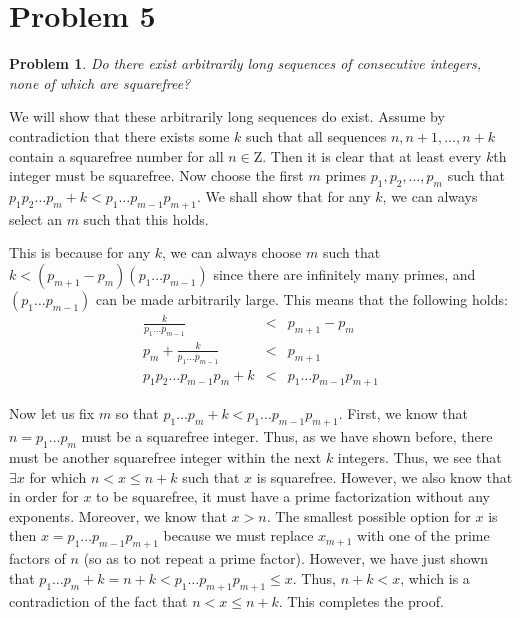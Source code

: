 \documentclass[psamsfonts]{amsart}
\newtheorem{prob}{Problem}[section]
\newenvironment{sol}{{\bfseries Solution}}{\qedsymbol}
\theoremstyle{definition}
\theoremstyle{remark}
\numberwithin{equation}{section}
\begin{document}
\section{Problem 5}

\begin{prob}
Do there exist arbitrarily long sequences of consecutive integers, none of which are squarefree? 
\end{prob}

\begin{sol}
We will show that these arbitrarily long sequences do exist. Assume by contradiction that there exists some $k$ such that all sequences $n, n+1, \ldots, n+k$ contain a squarefree number for all $n \in \mathrm{Z}$. Then it is clear that at least every $k$th integer must be squarefree. Now choose the first $m$ primes $p_1, p_2, \ldots, p_m$ such that $p_1 p_2 \ldots p_m + k < p_1 \ldots p_{m-1} p_{m+1}$. We shall show that for any $k$, we can always select an $m$ such that this holds. 

This is because for any $k$, we can always choose $m$ such that $k < (p_{m+1} - p_{m})(p_1 \ldots p_{m-1})$ since there are infinitely many primes, and $(p_1 \ldots p_{m-1})$ can be made arbitrarily large. This means that the following holds:
\begin{eqnarray}
\frac{k}{p_1 \ldots p_{m-1}} &<& p_{m+1} - p_m \\
p_m + \frac{k}{p_1 \ldots p_{m-1}} &<& p_{m+1} \\
p_1 p_2 \ldots p_{m-1} p_{m} + k &<& p_1 \ldots p_{m-1} p_{m+1} 
\end{eqnarray}

Now let us fix $m$ so that $p_1 \ldots p_m + k < p_1 \ldots p_{m-1} p_{m+1}$. First, we know that $n = p_1 \ldots p_m$ must be a squarefree integer. Thus, as we have shown before, there must be another squarefree integer within the next $k$ integers. Thus, we see that $\exists x$ for which $n < x \leq n + k$ such that $x$ is squarefree. However, we also know that in order for $x$ to be squarefree, it must have a prime factorization without any exponents. Moreover, we know that $x > n$. The smallest possible option for $x$ is then $x = p_1 \ldots p_{m-1} p_{m+1}$ because we must replace $x_{m+1}$ with one of the prime factors of $n$ (so as to not repeat a prime factor). However, we have just shown that $p_1 \ldots p_m + k = n + k < p_1 \ldots p_{m+1} p_{m+1} \leq x$. Thus, $n + k < x$, which is a contradiction of the fact that $n < x \leq n + k$. This completes the proof.
\end{sol}
\end{document}
